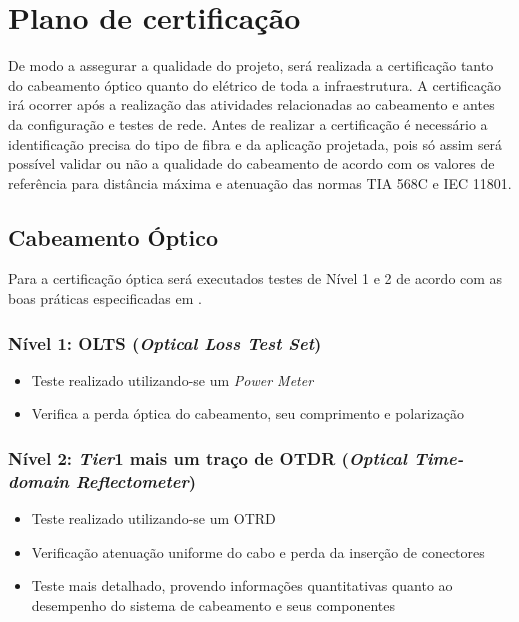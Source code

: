 \documentclass[	DIV=calc,%
							paper=a4,%
							fontsize=12pt,%
							onecolumn]{scrartcl}	 					%
\begin{document}

\section{Plano de certificação}
De modo a assegurar a qualidade do projeto, será realizada a certificação tanto do cabeamento óptico quanto do elétrico de toda a infraestrutura.
A certificação irá ocorrer após a realização das atividades relacionadas ao cabeamento e antes da configuração e testes de rede.
Antes de realizar a certificação é necessário a identificação precisa do tipo de fibra e da aplicação projetada, pois só assim será possível validar ou não a qualidade do cabeamento
de acordo com os valores de referência para distância máxima e atenuação das normas TIA 568C e IEC 11801. 

\subsection{Cabeamento Óptico}
Para a certificação óptica será executados testes de Nível 1 e 2 de acordo com as boas práticas especificadas em \cite{ref6}.
\subsubsection{Nível 1: OLTS (\textit{Optical Loss Test Set})}
\begin{itemize}
	\item Teste realizado utilizando-se um \textit{Power Meter}
	\item Verifica a perda óptica do cabeamento, seu comprimento e polarização
\end{itemize}

\subsubsection{Nível 2: \textit{Tier}1 mais um traço de OTDR (\textit{Optical Time-domain Reflectometer})}
\begin{itemize}
	\item Teste realizado utilizando-se um OTRD
	\item Verificação atenuação uniforme do cabo e perda da inserção de conectores
	\item Teste mais detalhado, provendo informações quantitativas quanto ao desempenho do sistema de cabeamento e seus componentes
\end{itemize}
\end{document}
